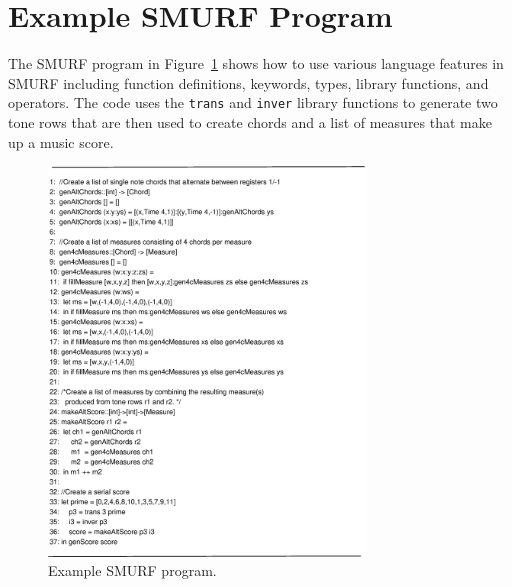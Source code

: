 \section{Example SMURF Program}

The SMURF program in Figure~\ref{fig:ex1} shows how to use various language features in SMURF including function definitions, keywords, types, library functions, and operators. The code uses the \texttt{trans} and \texttt{inver} library functions to generate two tone rows that are then used to create chords and a list of measures that make up a music score. 

\begin{figure}
        \centering
        \includegraphics[width=0.75\textwidth]{figures/example1}
        \caption{Example SMURF program.}
        \label{fig:ex1}
\end{figure}

